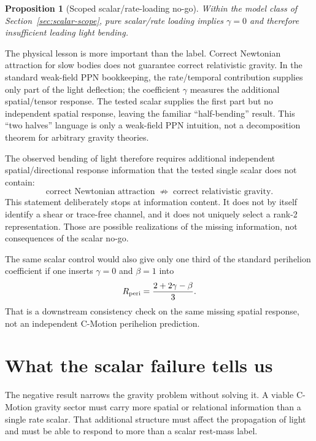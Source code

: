 \documentclass[11pt]{article}
\newcommand{\cmotion}{\mbox{C-Motion}}
\theoremstyle{plain}
\newtheorem{proposition}{Proposition}
\theoremstyle{remark}
\begin{document}
\begin{proposition}[Scoped scalar/rate-loading no-go]
Within the model class of Section~\ref{sec:scalar-scope}, pure scalar/rate loading implies
$\gamma=0$ and therefore insufficient leading light bending.
\end{proposition}

The physical lesson is more important than the label.  Correct Newtonian attraction for
slow bodies does not guarantee correct relativistic gravity.  In the standard weak-field
PPN bookkeeping, the rate/temporal contribution supplies only part of the light
deflection; the coefficient $\gamma$ measures the additional spatial/tensor response.
The tested scalar supplies the first part but no independent spatial response, leaving
the familiar ``half-bending'' result.  This ``two halves'' language is only a weak-field
PPN intuition, not a decomposition theorem for arbitrary gravity theories.

The observed bending of light therefore requires additional independent spatial/directional
response information that the tested single scalar does not contain:
\begin{equation}
\boxed{
\text{correct Newtonian attraction}
\;\not\Rightarrow\;
\text{correct relativistic gravity}.}
\end{equation}
This statement deliberately stops at information content.  It does not by itself identify a
shear or trace-free channel, and it does not uniquely select a rank-2 representation.  Those
are possible realizations of the missing information, not consequences of the scalar no-go.

The same scalar control would also give only one third of the standard perihelion
coefficient if one inserts $\gamma=0$ and $\beta=1$ into
\begin{equation}
R_{\rm peri}=\frac{2+2\gamma-\beta}{3}.
\end{equation}
That is a downstream consistency check on the same missing spatial response, not an
independent \cmotion{} perihelion prediction.

\section{What the scalar failure tells us}
\label{sec:lesson}

The negative result narrows the gravity problem without solving it.  A viable \cmotion{}
gravity sector must carry more spatial or relational information than a single rate
scalar.  That additional structure must affect the propagation of light and must be able
to respond to more than a scalar rest-mass label.
\end{document}
